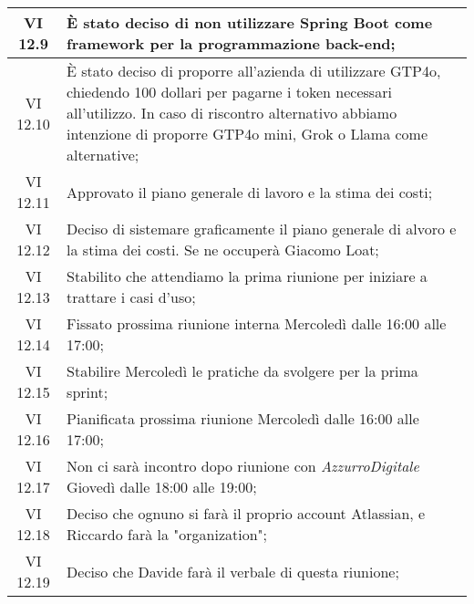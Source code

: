 \begin{table}[htbp]
\begin{tabular}{|c|p{}|}
        \hline
        VI 12.9 & È stato deciso di non utilizzare Spring Boot come framework per la programmazione back-end;\\
        \hline
        VI 12.10 & È stato deciso di proporre all'azienda di utilizzare GTP4o, chiedendo 100 dollari per pagarne i token necessari all'utilizzo. In caso di riscontro alternativo abbiamo intenzione di proporre GTP4o mini, Grok o Llama come alternative;\\
        \hline
        VI 12.11 & Approvato il piano generale di lavoro e la stima dei costi;\\
        \hline
        VI 12.12 & Deciso di sistemare graficamente il piano generale di alvoro e la stima dei costi. Se ne occuperà Giacomo Loat;\\
        \hline
        VI 12.13 & Stabilito che attendiamo la prima riunione per iniziare a trattare i casi d'uso;\\
        \hline
        VI 12.14 & Fissato prossima riunione interna Mercoledì dalle 16:00 alle 17:00;\\
        \hline
        VI 12.15 & Stabilire Mercoledì le pratiche da svolgere per la prima sprint;\\
        \hline
        VI 12.16 & Pianificata prossima riunione Mercoledì dalle 16:00 alle 17:00;\\
        \hline
        VI 12.17 & Non ci sarà incontro dopo riunione con \emph{AzzurroDigitale} Giovedì dalle 18:00 alle 19:00;\\
        \hline
        VI 12.18 & Deciso che ognuno si farà il proprio account Atlassian, e Riccardo farà la "organization";\\
        \hline
        VI 12.19 & Deciso che Davide farà il verbale di questa riunione;\\
        \hline

    \end{tabular}
\end{table}